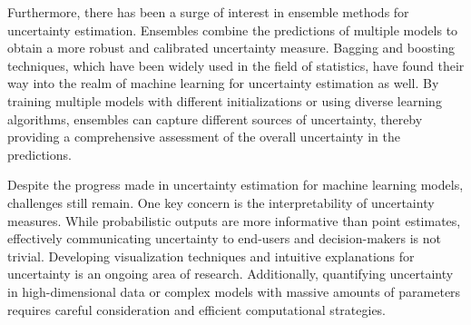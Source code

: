Furthermore, there has been a surge of interest in ensemble methods for uncertainty estimation. Ensembles combine the predictions of multiple models to obtain a more robust and calibrated uncertainty measure. Bagging and boosting techniques, which have been widely used in the field of statistics, have found their way into the realm of machine learning for uncertainty estimation as well. By training multiple models with different initializations or using diverse learning algorithms, ensembles can capture different sources of uncertainty, thereby providing a comprehensive assessment of the overall uncertainty in the predictions.

Despite the progress made in uncertainty estimation for machine learning models, challenges still remain. One key concern is the interpretability of uncertainty measures. While probabilistic outputs are more informative than point estimates, effectively communicating uncertainty to end-users and decision-makers is not trivial. Developing visualization techniques and intuitive explanations for uncertainty is an ongoing area of research. Additionally, quantifying uncertainty in high-dimensional data or complex models with massive amounts of parameters requires careful consideration and efficient computational strategies.


\fi 
